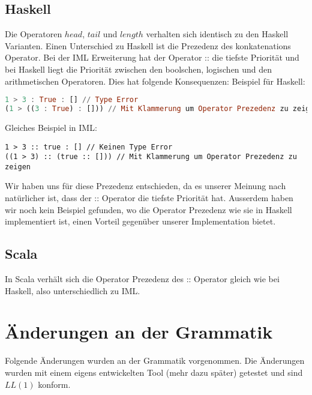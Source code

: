 \documentclass[a4paper,notitlepage,oneside]{scrartcl}
\begin{document}
\subsection{Haskell}
Die Operatoren $head$, $tail$ und $length$ verhalten sich identisch zu den Haskell Varianten. Einen Unterschied zu Haskell ist die Prezedenz des konkatenations Operator. Bei der IML Erweiterung hat der Operator :: die tiefste Priorität und bei Haskell liegt die Priorität zwischen den boolschen, logischen und den arithmetischen Operatoren. Dies hat folgende Konsequenzen:
\newline
\newline
Beispiel für Haskell: 

\begin{lstlisting}[language=haskell, caption=Ungültige Listen Konkatenation in Haskell]
1 > 3 : True : [] // Type Error
(1 > ((3 : True) : [])) // Mit Klammerung um Operator Prezedenz zu zeigen
\end{lstlisting}

\raggedright
Gleiches Beispiel in IML:

\begin{lstlisting}[language=iml, caption=Gültige Listen Konkatenation in IML]
1 > 3 :: true : [] // Keinen Type Error
((1 > 3) :: (true :: [])) // Mit Klammerung um Operator Prezedenz zu zeigen
\end{lstlisting}
Wir haben uns für diese Prezedenz entschieden, da es unserer Meinung nach natürlicher ist, dass der :: Operator die tiefste Priorität hat.
Ausserdem haben wir noch kein Beispiel gefunden, wo die Operator Prezedenz wie sie in Haskell implementiert ist, einen Vorteil gegenüber unserer Implementation bietet.

\subsection{Scala}
In Scala verhält sich die Operator Prezedenz des :: Operator gleich wie bei Haskell, also unterschiedlich zu IML.


\newpage
\section{Änderungen an der Grammatik}
Folgende Änderungen wurden an der Grammatik vorgenommen. Die Änderungen wurden mit einem eigens entwickelten Tool (mehr dazu später) getestet und sind $LL(1)$ konform.
\end{document}
